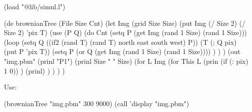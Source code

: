 \begin{wideverbatim}

(load "@lib/simul.l")

(de brownianTree (File Size Cnt)
   (let Img (grid Size Size)
      (put Img (/ Size 2) (/ Size 2) 'pix T)
      (use (P Q)
         (do Cnt
            (setq P (get Img (rand 1 Size) (rand 1 Size)))
            (loop
               (setq Q ((if2 (rand T) (rand T) north east south west) P))
               (T (; Q pix) (put P 'pix T))
               (setq P (or Q (get Img (rand 1 Size) (rand 1 Size)))) ) ) )
      (out "img.pbm"
         (prinl "P1")
         (prinl Size " " Size)
         (for L Img
            (for This L
               (prin (if (: pix) 1 0)) )
            (prinl) ) ) ) )

Use:

(brownianTree "img.pbm" 300 9000)
(call 'display "img.pbm")

\end{wideverbatim}







